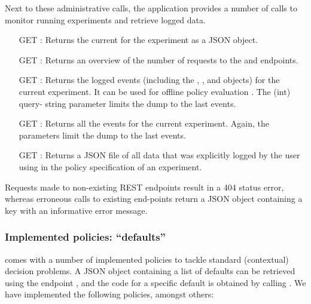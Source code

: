 \documentclass[nojss]{jss}
\begin{document}
Next to these administrative calls, the application provides a number of calls to monitor running experiments and retrieve logged data. 

\begin{itemize}
\item [GET] : Returns the current  for the experiment as a JSON object.
\item [GET] : Returns an overview of the number of requests to the  and  endpoints.
\item [GET] : Returns the logged  events (including the , , and  objects) for the current experiment. It can be used for offline policy evaluation \citep[see, e.g., ][]{Li2010a, agarwal2016making}. The  (int) query- string parameter limits the dump to the last  events.
\item [GET] : Returns all the  events for the current experiment. Again, the  parameters limit the dump to the last  events.
\item [GET] : Returns a JSON file of all data that was explicitly logged by the user using  in the policy specification of an  experiment.
\end{itemize}

Requests made to non-existing REST endpoints result in a 404 status error, whereas erroneous calls to existing end-points return a JSON object containing a key  with an informative error message.

\subsubsection{Implemented policies: ``defaults''}
\label{sec:defaults}

 comes with a number of implemented policies to tackle standard (contextual) decision problems. A JSON object containing a list of defaults can be retrieved using the endpoint , and the code for a specific default is obtained by calling . We have implemented the following policies, amongst others:
\end{document}
